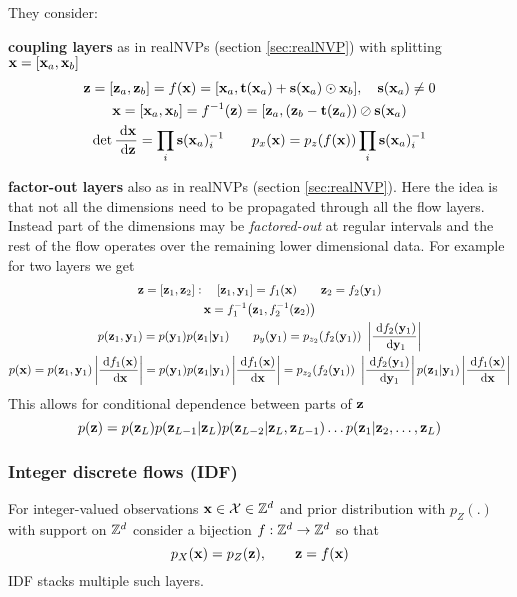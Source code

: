 They consider:
\begin{compactitem}
\item \textbf{coupling layers} as in realNVPs (section \ref{sec:realNVP}) with splitting $\mathbf{x} = [\mathbf{x}_a, \mathbf{x}_b]$
\begin{gather}
\mathbf{z} = [\mathbf{z}_a, \mathbf{z}_b] = f(\mathbf{x}) = [\mathbf{x}_a, \mathbf{t}(\mathbf{x}_a) + \mathbf{s}(\mathbf{x}_a) \odot \mathbf{x}_{b}], \quad \mathbf{s}(\mathbf{x}_a) \neq 0 \nonumber \\
\mathbf{x} = [\mathbf{x}_a, \mathbf{x}_b] = f^{-1}(\mathbf{z}) = [\mathbf{z}_{a}, (\mathbf{z}_{b} - \mathbf{t}(\mathbf{z}_a)) \oslash \mathbf{s}(\mathbf{x}_a) \nonumber \\
\det \frac{\; \text{d} \mathbf{x}}{\; \text{d} \mathbf{z}} = \prod_{i} \mathbf{s}(\mathbf{x}_a)_i^{-1} \qquad p_x(\mathbf{x}) = p_z(f(\mathbf{x})) \prod_{i} \mathbf{s}(\mathbf{x}_a)_i^{-1}
\end{gather}
\item \textbf{factor-out layers} also as in realNVPs (section \ref{sec:realNVP}). Here the idea is that not all the dimensions need to be propagated through all the flow layers. Instead part of the dimensions may be \emph{factored-out} at regular intervals and the rest of the flow operates over the remaining lower dimensional data.
For example for two layers we get
\begin{gather}
\mathbf{z} = [\mathbf{z}_1, \mathbf{z}_2]: \quad [\mathbf{z}_1, \mathbf{y}_1] = f_1(\mathbf{x}) \qquad \mathbf{z}_2 = f_2(\mathbf{y}_1) \nonumber \\
\mathbf{x} = f_1^{-1}\big(\mathbf{z}_1, f_2^{-1}(\mathbf{z}_2)\big) \nonumber \\
p(\mathbf{z}_1, \mathbf{y}_1) = p(\mathbf{y}_1) p(\mathbf{z}_1 \vert \mathbf{y}_1) \qquad
p_y(\mathbf{y}_1) = p_{z_2}(f_2(\mathbf{y}_1)) \ \left\lvert \frac{\; \text{d} f_2(\mathbf{y}_1)}{\; \text{d} \mathbf{y}_1} \right\lvert \nonumber \\
p(\mathbf{x}) = p(\mathbf{z}_1, \mathbf{y}_1) \left\lvert \frac{\; \text{d} f_1(\mathbf{x})}{\; \text{d} \mathbf{x}} \right\lvert
= p(\mathbf{y}_1) p(\mathbf{z}_1 \vert \mathbf{y}_1) \left\lvert \frac{\; \text{d} f_1(\mathbf{x})}{\; \text{d} \mathbf{x}} \right\lvert
= p_{z_2}(f_2(\mathbf{y}_1)) \ \left\lvert \frac{\; \text{d} f_2(\mathbf{y}_1)}{\; \text{d} \mathbf{y}_1} \right\lvert
p(\mathbf{z}_1 \vert \mathbf{y}_1) \left\lvert \frac{\; \text{d} f_1(\mathbf{x})}{\; \text{d} \mathbf{x}} \right\lvert \nonumber
\end{gather}
This allows for conditional dependence between parts of $\mathbf{z}$
\begin{equation}
p(\mathbf{z}) = p(\mathbf{z}_L) p(\mathbf{z}_{L-1} \vert \mathbf{z}_{L})p(\mathbf{z}_{L-2} \vert \mathbf{z}_{L}, \mathbf{z}_{L-1}) \ldots p(\mathbf{z}_{1} \vert \mathbf{z}_{2}, \ldots, \mathbf{z}_{L})
\end{equation}

\end{compactitem}

\subsubsection{Integer discrete flows (IDF)}
For integer-valued observations $\mathbf{x} \in \mathcal{X} \in \mathbb{Z}^d$ and prior distribution with $p_Z(.)$ with support on $\mathbb{Z}^d$ consider a bijection $f : \mathbb{Z}^d \to \mathbb{Z}^d$ so that
\begin{equation}
p_X(\mathbf{x}) = p_Z(\mathbf{z}), \qquad \mathbf{z} = f(\mathbf{x})
\end{equation}
IDF stacks multiple such layers. 

